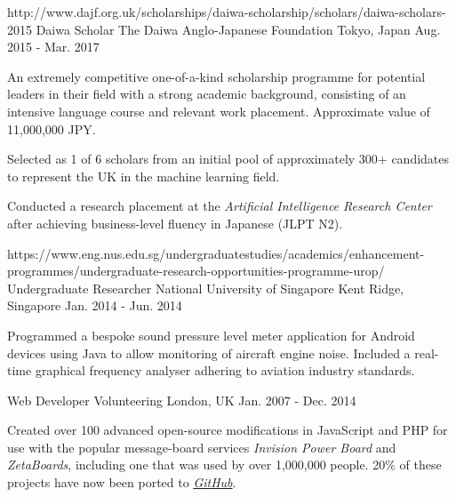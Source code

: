 \begin{cventries}
  \cventry
    {http://www.dajf.org.uk/scholarships/daiwa-scholarship/scholars/daiwa-scholars-2015}
    {Daiwa Scholar} %
    {The Daiwa Anglo-Japanese Foundation} %
    {Tokyo, Japan} %
    {Aug. 2015 - Mar. 2017} %
    {
      \begin{cvitems} %
        \item {An extremely competitive one-of-a-kind scholarship programme for potential leaders in their field with a strong academic background, consisting of an intensive language course and relevant work placement. Approximate value of 11,000,000 JPY.}
        \item {Selected as 1 of 6 scholars from an initial pool of approximately 300+ candidates to represent the UK in the machine learning field.}
        \item {Conducted a research placement at the \emph{Artificial Intelligence Research Center} after achieving business-level fluency in Japanese (JLPT N2).}
      \end{cvitems}
    }

  \cventry
    {https://www.eng.nus.edu.sg/undergraduatestudies/academics/enhancement-programmes/undergraduate-research-opportunities-programme-urop/}
    {Undergraduate Researcher} %
    {National University of Singapore} %
    {Kent Ridge, Singapore} %
    {Jan. 2014 - Jun. 2014} %
    {
      \begin{cvitems} %
        \item {Programmed a bespoke sound pressure level meter application for Android devices using Java to allow monitoring of aircraft engine noise. Included a real-time graphical frequency analyser adhering to aviation industry standards.}
      \end{cvitems}
    }

  \cventry
    {} %
    {Web Developer} %
    {Volunteering} %
    {London, UK} %
    {Jan. 2007 - Dec. 2014} %
    {
      \begin{cvitems} %
        \item {Created over 100 advanced open-source modifications in JavaScript and PHP for use with the popular message-board services \textit{Invision Power Board} and \textit{ZetaBoards}, including one that was used by over 1,000,000 people. 20\% of these projects have now been ported to \href{https://github.com/KeirSimmons/ZetaBoards}{\emph{GitHub}}.}
      \end{cvitems}
    }


\end{cventries}
